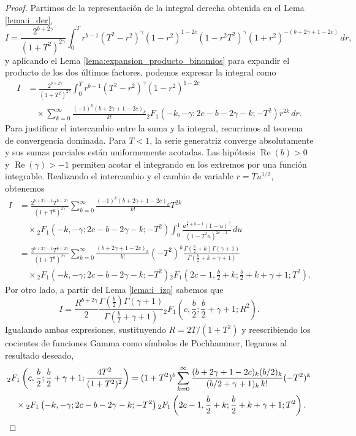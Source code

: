 \documentclass[12pt,a4paper]{book}
\begin{document}
\begin{proof}
Partimos de la representación de la integral derecha obtenida en el Lema \ref{lema:i_der},
\[
I = \frac{2^{b+2\gamma}}{(1+T^2)^{2\gamma}} \int_{0}^{T} r^{b-1} (T^2-r^2)^\gamma (1-r^2)^{1-2c} (1-r^2T^2)^\gamma (1+r^2)^{-(b+2\gamma+1-2c)} \, dr,
\]
y aplicando el Lema \ref{lema:expansion_producto_binomios} para expandir el producto de los dos últimos factores, podemos expresar la integral como
\begin{align*}
    I &= \frac{2^{b+2\gamma}}{(1+T^2)^{2\gamma}} \int_{0}^{T} r^{b-1} (T^2-r^2)^\gamma (1-r^2)^{1-2c} \\
    &\quad \times  \sum_{k=0}^{\infty} \frac{(-1)^k (b+2\gamma+1-2c)_k}{k!} {}_{2}F_{1}\left(-k, -\gamma; 2c-b-2\gamma-k; -T^2\right) r^{2k}  \, dr.
\end{align*}
Para justificar el intercambio entre la suma y la integral, recurrimos al teorema de convergencia dominada. Para $T < 1$, la serie generatriz converge absolutamente y sus sumas parciales están uniformemente acotadas. Las hipótesis $\operatorname{Re}(b) > 0$ y $\operatorname{Re}(\gamma) > -1$ permiten acotar el integrando en los extremos por una función integrable. Realizando el intercambio y el cambio de variable $r = T u^{1/2}$, obtenemos
\begin{align*}
    I &= \frac{2^{b+2\gamma-1} T^{b+2\gamma}}{(1+T^2)^{2\gamma}} \sum_{k=0}^{\infty} \frac{(-1)^k (b+2\gamma+1-2c)_k}{k!} T^{2k}\\ 
    &\quad \times {}_{2}F_{1}\left(-k, -\gamma; 2c-b-2\gamma-k; -T^2\right) 
     \int_{0}^{1} \frac{u^{\frac{b}{2}+k-1}(1-u)^\gamma}{(1-T^2 u)^{2c-1}}   \, du \\
     &= \frac{2^{b+2\gamma-1} T^{b+2\gamma}}{(1+T^2)^{2\gamma}} \sum_{k=0}^{\infty} \frac{ (b+2\gamma+1-2c)_k}{k!} (-T^2)^{k} \frac{\Gamma\left(\frac{b}{2}+k\right)\Gamma(\gamma+1)}{\Gamma\left(\frac{b}{2}+k+\gamma+1\right)} \\
    &\quad \times {}_{2}F_{1}\left(-k, -\gamma; 2c-b-2\gamma-k; -T^2\right) {}_{2}F_{1}\left(2c-1, \frac{b}{2}+k; \frac{b}{2}+k+\gamma+1; T^2\right).
\end{align*}
Por otro lado, a partir del Lema \ref{lema:i_izq} sabemos que
\[
    I = \frac{R^{b+2\gamma}}{2} \frac{\Gamma\left(\frac{b}{2}\right)\Gamma(\gamma+1)}{\Gamma\left(\frac{b}{2}+\gamma+1\right)} {}_{2}F_{1}\left(c, \frac{b}{2}; \frac{b}{2}+\gamma+1; R^2\right).
\]
Igualando ambas expresiones, sustituyendo $R = 2T/(1+T^2)$ y reescribiendo los cocientes de funciones Gamma como símbolos de Pochhammer, llegamos al resultado deseado, 
\begin{align*}
    & {}_{2}F_{1}\left(c, \frac{b}{2}; \frac{b}{2}+\gamma+1; \frac{4T^2}{(1+T^2)^2}\right)  = (1+T^2)^b \sum_{k=0}^{\infty} \frac{(b+2\gamma+1-2c)_k (b/2)_k}{(b/2+\gamma+1)_k \, k!} (-T^2)^{k} \\
    &\quad \times {}_{2}F_{1}\left(-k, -\gamma; 2c-b-2\gamma-k; -T^2\right) {}_{2}F_{1}\left(2c-1, \frac{b}{2}+k; \frac{b}{2}+k+\gamma+1; T^2\right).
    \qedhere
\end{align*}
\end{proof}
\end{document}
